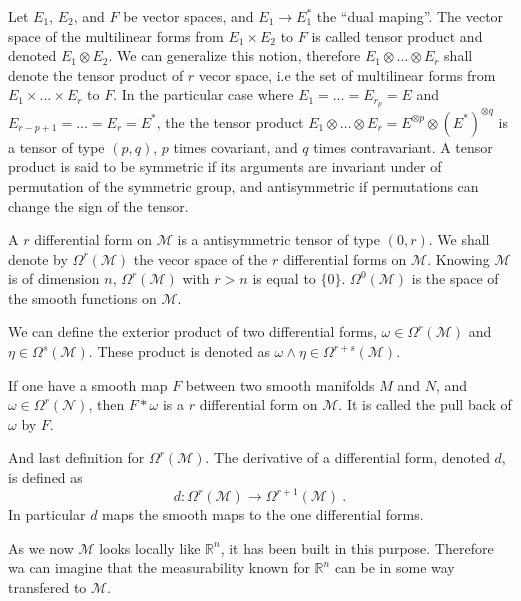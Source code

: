 \documentclass[10pt]{book}
\newcommand{\Mcal}{\mathcal{M}}
\newcommand{\Ncal}{\mathcal{N}}
\newcommand{\Rbb}{\mathbb{R}}
\theoremstyle{break}
\begin{document}
Let $E_1$, $E_2$, and $F$ be vector spaces, and $E_1 \to E_1^\ast$ the ``dual maping''. The vector space of the multilinear forms from $E_1 \times E_2$ to $F$ is called tensor product and denoted $E_1 \otimes E_2$. We can generalize this notion, therefore $E_1 \otimes \dots \otimes E_r$ shall denote the tensor product of $r$ vecor space, i.e the set of multilinear forms from $E_1 \times \dots \times E_r$ to $F$. In the particular case where $E_1 = \dots = E_{r_p} = E$ and $E_{r-p+1} = \dots = E_r = E^\ast$, the the tensor product $E_1 \otimes \dots \otimes E_r = E^{\otimes p} \otimes (E^\ast)^{\otimes q}$ is a tensor of type $(p,q)$, $p$ times covariant, and $q$ times contravariant. A tensor product is said to be symmetric if its arguments are invariant under of permutation of the symmetric group, and antisymmetric if permutations can change the sign of the tensor.


\bigskip


A $r$ differential form on $\Mcal$ is a antisymmetric tensor of type $(0,r)$. We shall denote by $\Omega^r(\Mcal)$ the vecor space of the $r$ differential forms on $\Mcal$. Knowing $\Mcal$ is of dimension $n$, $\Omega^r(\Mcal)$ with $r>n$ is equal to $\{0\}$. $\Omega^0(\Mcal)$ is the space of the smooth functions on $\Mcal$.

We can define the exterior product of two differential forms, $\omega \in \Omega^r(\Mcal)$ and $\eta \in \Omega^s(\Mcal)$. These product is denoted as $\omega \wedge \eta \in \Omega^{r+s}(\Mcal)$. 

If one have a smooth map $F$ between two smooth manifolds $M$ and $N$, and $\omega \in \Omega^r(\Ncal)$, then $F\ast\omega$ is a $r$ differential form on $\Mcal$. It is called the pull back of $\omega$ by $F$.

And last definition for $\Omega^r(\Mcal)$. The derivative of a differential form, denoted $d$, is defined as 
%
\begin{equation*}
d : \Omega^r(\Mcal) \to \Omega^{r+1}(\Mcal) \ .
\end{equation*}
In particular $d$ maps the smooth maps to the one differential forms.


\bigskip


As we now $\Mcal$ looks locally like $\Rbb^n$, it has been built in this purpose. Therefore wa can imagine that the measurability known for $\Rbb^n$ can be in some way transfered to $\Mcal$.


\bigskip
\end{document}
